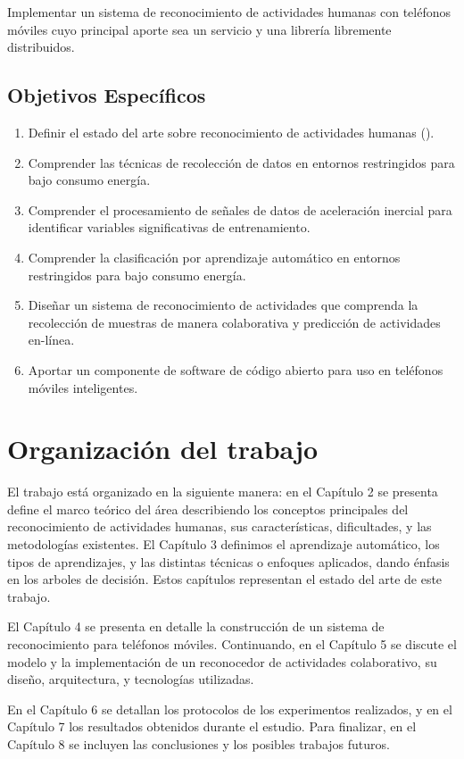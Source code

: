 \label{objetivo-general}

Implementar un sistema de reconocimiento de actividades humanas con
teléfonos móviles cuyo principal aporte sea un servicio y una librería
libremente distribuidos.

\subsection{Objetivos Específicos}

\label{objetivos-especuxedficos}
\begin{enumerate}
\item \label{enu:obe1}Definir el estado del arte sobre reconocimiento de
actividades humanas (). 
\item \label{enu:obe2}Comprender las técnicas de recolección de datos en
entornos restringidos para bajo consumo energía. 
\item \label{enu:obe3}Comprender el procesamiento de señales de datos de
aceleración inercial para identificar variables significativas de
entrenamiento. 
\item \label{enu:obe4}Comprender la clasificación por aprendizaje automático
en entornos restringidos para bajo consumo energía. 
\item \label{enu:obe5}Diseñar un sistema de reconocimiento de actividades
que comprenda la recolección de muestras de manera colaborativa y
predicción de actividades en-línea. 
\item \label{enu:obe6}Aportar un componente de software de código abierto
para uso en teléfonos móviles inteligentes. 
\end{enumerate}

\section{Organización del trabajo}

\label{sec14:organizaciuxf3n-del-trabajo}

El trabajo está organizado en la siguiente manera: en el Capítulo
2 se presenta define el marco teórico del área describiendo los conceptos
principales del reconocimiento de actividades humanas, sus características,
dificultades, y las metodologías existentes. El Capítulo 3 definimos
el aprendizaje automático, los tipos de aprendizajes, y las distintas
técnicas o enfoques aplicados, dando énfasis en los arboles de decisión.
Estos capítulos representan el estado del arte de este trabajo.

El Capítulo 4 se presenta en detalle la construcción de un sistema
de reconocimiento para teléfonos móviles. Continuando, en el Capítulo
5 se discute el modelo y la implementación de un reconocedor de actividades
colaborativo, su diseño, arquitectura, y tecnologías utilizadas.

En el Capítulo 6 se detallan los protocolos de los experimentos realizados,
y en el Capítulo 7 los resultados obtenidos durante el estudio. Para
finalizar, en el Capítulo 8 se incluyen las conclusiones y los posibles
trabajos futuros. 
